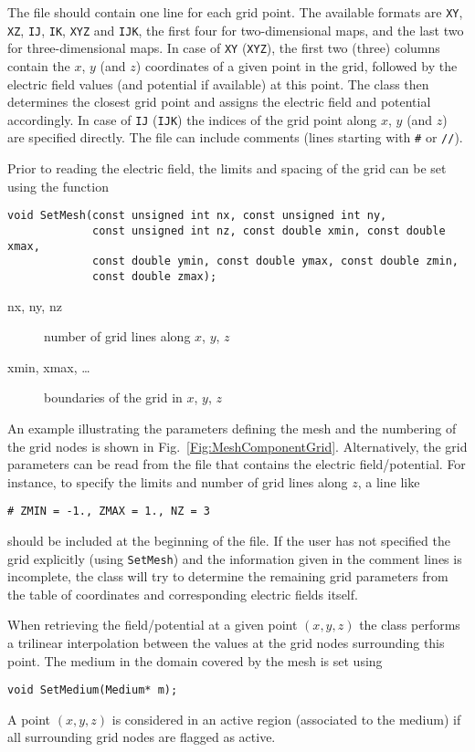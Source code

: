 The file should contain one line for each grid point.
The available formats are \texttt{XY}, \texttt{XZ}, \texttt{IJ}, 
\texttt{IK}, \texttt{XYZ} and \texttt{IJK}, the first four 
for two-dimensional maps, and the 
last two for three-dimensional maps.
In case of \texttt{XY} (\texttt{XYZ}), the first two (three) columns  
contain the $x$, $y$ (and $z$) coordinates of a given point in the 
grid, followed by the electric field values (and potential if available) at 
this point. The class then determines the closest grid point 
and assigns the electric field and potential accordingly.
In case of \texttt{IJ} (\texttt{IJK}) the indices of the grid point 
along $x$, $y$ (and $z$) are specified directly.
The file can include comments (lines starting with \texttt{\#} or \texttt{//}). 

Prior to reading the electric field, the limits and spacing of the grid 
can be set using the function
\begin{lstlisting}
void SetMesh(const unsigned int nx, const unsigned int ny,
             const unsigned int nz, const double xmin, const double xmax,
             const double ymin, const double ymax, const double zmin,
             const double zmax);
\end{lstlisting}
\begin{description}
  \item[nx, ny, nz] 
  number of grid lines along $x$, $y$, $z$
  \item[xmin, xmax, \dots] 
  boundaries of the grid in $x$, $y$, $z$
\end{description}
An example illustrating the parameters defining the mesh and the 
numbering of the grid nodes is shown in Fig.~\ref{Fig:MeshComponentGrid}.
Alternatively, the grid parameters can be read from the file that contains
the electric field/potential. For instance, to specify the 
limits and number of grid lines along $z$, a line like 
\begin{lstlisting}
# ZMIN = -1., ZMAX = 1., NZ = 3 
\end{lstlisting} 
should be included at the beginning of the file.
If the user has not specified the grid explicitly (using \texttt{SetMesh}) 
and the information given in the comment lines is incomplete, the 
class will try to determine the remaining grid parameters from the 
table of coordinates and corresponding electric fields itself.

When retrieving the field/potential at a given point $\left(x, y, z\right)$ 
the class performs a trilinear interpolation between the values at the 
grid nodes surrounding this point. The medium in the domain covered by the mesh 
is set using 
\begin{lstlisting}
void SetMedium(Medium* m);
\end{lstlisting}
A point $\left(x,y,z\right)$ is considered in an active region 
(\ie associated to the medium) if all surrounding grid nodes are 
flagged as active. 

